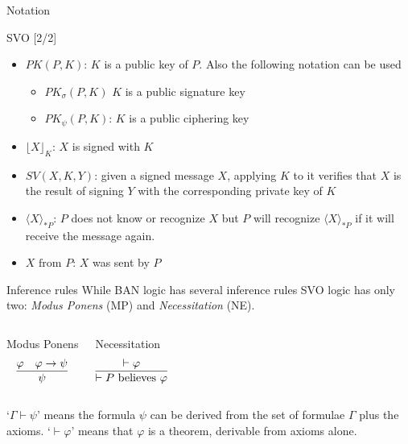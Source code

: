 \documentclass[10pt]{beamer}
\newcommand{\xtext}[1]{\text{ #1 }}
\begin{document}
\begin{frame}{Notation}
	\begin{block}{SVO [2/2]}
	\begin{itemize}
		\item $PK(P,K)$: $K$ is a public key of $P$. Also the following notation can be used
		\begin{itemize}
			\item $PK_\sigma(P,K)$ $K$ is a public signature key 
			\item $PK_\psi(P,K)$: $K$ is a public ciphering key 
		\end{itemize}
		\item $\lfloor X\rfloor_K$: $X$ is signed with $K$
		\item $SV(X,K,Y)$: given a signed message $X$, applying $K$ to it verifies that $X$ is the result of signing $Y$ with the corresponding private key of $K$
		\item $\langle  X\rangle_{*P}$: $P$ does not know or recognize $X$ but $P$ will recognize $\langle  X\rangle_{*P}$ if it will receive the message again.
		\item $X \xtext{from} P$: $X$ was sent by $P$
	\end{itemize}
\end{block}
\end{frame}
\begin{frame}{Inference rules}
	While BAN logic has several inference rules SVO logic has only \alert{two}: \emph{Modus Ponens} (MP) and \emph{Necessitation} (NE).
	\begin{columns}[T, onlytextwidth]
		\begin{block}{Modus Ponens}
			$$\infer{\psi}{%
				\varphi & \varphi \rightarrow \psi
			}$$
		\end{block}
		\begin{block}{Necessitation}
			$$\infer{\vdash P \xtext{believes} \varphi}{%
				\vdash \varphi
			}$$
		\end{block}
	\end{columns}
	\par \vspace{1.0cm}
	`$\Gamma \vdash \psi$' means the formula $\psi$ can be derived from the set of formulae $\Gamma$ plus the axioms. `$\vdash \varphi$' means that $\varphi$ is a theorem, derivable from axioms alone. 
\end{frame}
\end{document}
